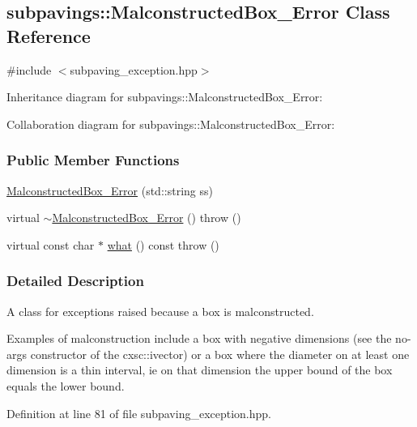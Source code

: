 \hypertarget{classsubpavings_1_1MalconstructedBox__Error}{\subsection{subpavings\-:\-:\-Malconstructed\-Box\-\_\-\-Error \-Class \-Reference}
\label{classsubpavings_1_1MalconstructedBox__Error}
}


{\ttfamily \#include $<$subpaving\-\_\-exception.\-hpp$>$}



\-Inheritance diagram for subpavings\-:\-:\-Malconstructed\-Box\-\_\-\-Error\-:


\-Collaboration diagram for subpavings\-:\-:\-Malconstructed\-Box\-\_\-\-Error\-:
\subsubsection*{\-Public \-Member \-Functions}
\begin{DoxyCompactItemize}
\item 
\hyperlink{classsubpavings_1_1MalconstructedBox__Error_ac5a7d2f4e8053bcda5a12655dd8b4f23}{\-Malconstructed\-Box\-\_\-\-Error} (std\-::string ss)
\item 
virtual \hyperlink{classsubpavings_1_1MalconstructedBox__Error_aeb53ed1fb7167531e2c69d6b01fd786a}{$\sim$\-Malconstructed\-Box\-\_\-\-Error} ()  throw ()
\item 
virtual const char $\ast$ \hyperlink{classsubpavings_1_1MalconstructedBox__Error_a5860a67a6c495dbd1435d4c8c4415f19}{what} () const   throw ()
\end{DoxyCompactItemize}


\subsubsection{\-Detailed \-Description}
\-A class for exceptions raised because a box is malconstructed.

\-Examples of malconstruction include a box with negative dimensions (see the no-\/args constructor of the cxsc\-::ivector) or a box where the diameter on at least one dimension is a thin interval, ie on that dimension the upper bound of the box equals the lower bound. 

\-Definition at line 81 of file subpaving\-\_\-exception.\-hpp.



